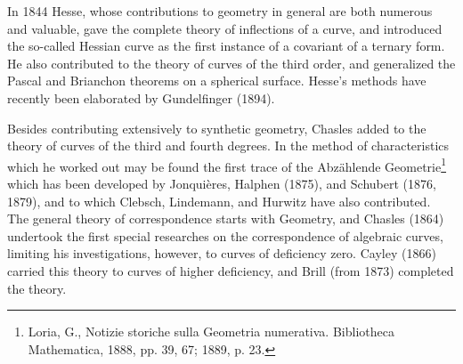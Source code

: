 \documentclass[oneside]{book}
\begin{document}
{In 1844 Hesse, whose contributions to geometry in general are both
numerous and valuable, gave the complete theory of inflections of a
curve, and introduced the so-called Hessian curve as the first
instance of a covariant of a ternary form. He also contributed to
the theory of curves of the third order, and generalized the Pascal
and Brianchon theorems on a spherical surface. Hesse's methods have
recently been elaborated by Gundelfinger (1894).

Besides contributing extensively to synthetic geometry, Chasles
added to the theory of curves of the third and fourth degrees. In
the method of characteristics which he worked out may be found the
first trace of the Abz\"ahlende Geometrie\footnote{Loria, G.,
Notizie storiche sulla Geometria numerativa. Bibliotheca Mathematica,
1888, pp. 39, 67; 1889, p. 23.} which has been developed by Jonqui\`eres,
Halphen (1875), and Schubert (1876, 1879), and to which Clebsch, Lindemann,
and Hurwitz have also contributed. The general theory of correspondence starts
with Geometry, and Chasles (1864) undertook the first special
researches on the correspondence of algebraic curves, limiting his
investigations, however, to curves of deficiency zero. Cayley (1866)
carried this theory to curves of higher deficiency, and Brill (from
1873) completed the theory.

}
\end{document}
